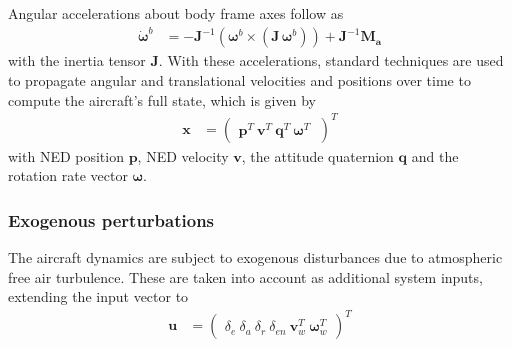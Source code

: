 \documentclass{ifacconf}
\begin{document}
Angular accelerations about body frame axes follow as
\begin{align}
\dot{\mathbf{\omega}}^b &= -\mathbf{J}^{-1} ({\mathbf{\omega}^b} 
\times 
(\mathbf{J} \,{\mathbf{\omega}^b}))
+ \mathbf{J}^{-1} 
\mathbf{M_a}
\end{align}
with the inertia tensor $\mathbf{J}$.
With these accelerations, standard techniques are used to propagate angular and translational velocities and positions over time to compute the aircraft's full state, which is given by
%
\begin{align}
\mathbf{x} &= 
\begin{pmatrix}
\mathbf{p}^T \:
\mathbf{v}^T \:
\mathbf{q}^T \:
\mathbf{\omega}^T \:
\end{pmatrix}^T 
\end{align}
with NED position $\mathbf{p}$, NED velocity $\mathbf{v}$, the attitude quaternion $\mathbf{q}$ and the rotation rate vector $\mathbf{\omega}$.
\subsubsection{Exogenous perturbations}
%
The aircraft dynamics are subject to exogenous disturbances due to atmospheric free air turbulence. These are taken into account as additional system inputs, extending the input vector to
%
\begin{align}
\mathbf{u} &= 
\begin{pmatrix}
\delta_{e} \:
\delta_{a} \:
\delta_{r} \:
\delta_{en} \:
\mathbf{v}_w^T \:
\mathbf{\omega}_w^T
\end{pmatrix}^T
\end{align}
\end{document}
